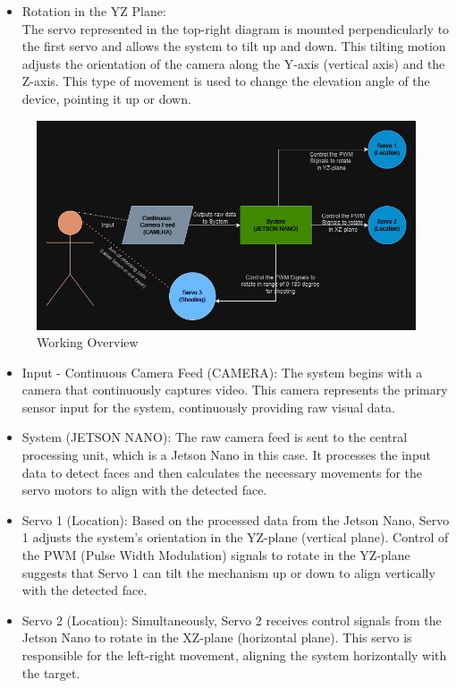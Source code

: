 \documentclass[a4paper,11pt]{article}%
\newenvironment{qanda}{\setlength{\parindent}{0pt}}{\bigskip}
\begin{document}
\begin{qanda}
\begin{enumerate}
\begin{itemize}
				\item[]Rotation in the YZ Plane:\\
				The servo represented in the top-right diagram is mounted perpendicularly to the first servo and allows the system to tilt up and down. This tilting motion adjusts the orientation of the camera along the Y-axis (vertical axis) and the Z-axis. This type of movement is used to change the elevation angle of the device, pointing it up or down.
			\end{itemize}




			\begin{figure}[H]
				\centering
				\includegraphics[scale=0.6]{figures/hw_overview.jpeg}
				\caption{Working Overview}
			\end{figure}
			\begin{itemize}
				\item Input - Continuous Camera Feed (CAMERA): The system begins with a camera that continuously captures video. This camera represents the primary sensor input for the system, continuously providing raw visual data.
				\item System (JETSON NANO): The raw camera feed is sent to the central processing unit, which is a Jetson Nano in this case. It processes the input data to detect faces and then calculates the necessary movements for the servo motors to align with the detected face.
				\item Servo 1 (Location): Based on the processed data from the Jetson Nano, Servo 1 adjusts the system's orientation in the YZ-plane (vertical plane). Control of the PWM (Pulse Width Modulation) signals to rotate in the YZ-plane suggests that Servo 1 can tilt the mechanism up or down to align vertically with the detected face.
				\item Servo 2 (Location): Simultaneously, Servo 2 receives control signals from the Jetson Nano to rotate in the XZ-plane (horizontal plane). This servo is responsible for the left-right movement, aligning the system horizontally with the target.

\end{itemize}
\end{enumerate}
\end{qanda}
\end{document}

